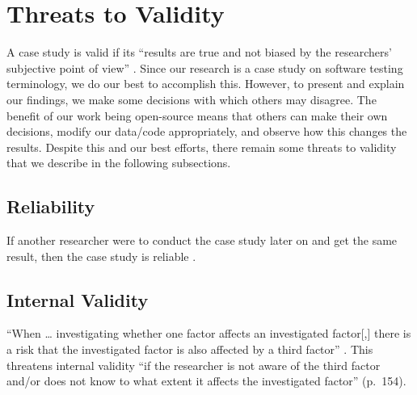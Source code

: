 \section{Threats to Validity}\label{threats}

A case study is valid if its ``results are true and not biased by the
researchers' subjective point of view'' \citep[p.~153]{RunesonAndHöst2009}.
Since our research is a case study on software testing terminology, we do our
best to accomplish this. However, to present and explain our findings,
we make some decisions with which others may disagree. The benefit of our work
being open-source means that others can make their own decisions, modify our
data/code appropriately, and observe how this changes the results. Despite this
and our best efforts, there remain some threats to validity that we describe in
the following subsections.

\subsection{Reliability}\label{rel-valid}
If another researcher were to conduct the case study later on and get the same
result, then the case study is reliable
\citep[p.~154]{RunesonAndHöst2009}.

\subsection{Internal Validity}\label{inter-valid}
``When \dots{} investigating whether one factor affects an investigated factor[,]
there is a risk that the investigated factor is also affected by a third factor''
\citep[p.~154]{RunesonAndHöst2009}. This threatens internal validity ``if the
researcher is not aware of the third factor and/or does not know to what extent
it affects the investigated factor'' (p.~154).

